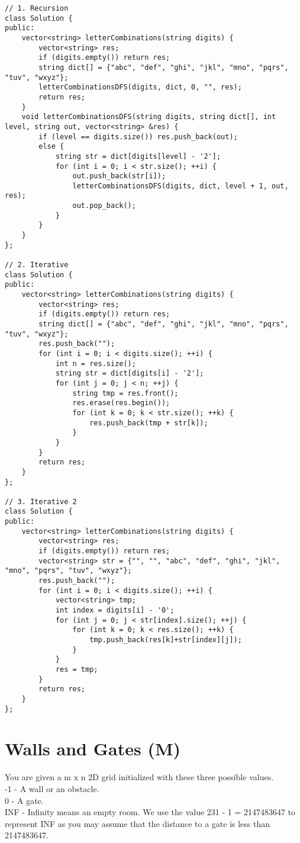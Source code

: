 \begin{lstlisting}
// 1. Recursion
class Solution {
public:
    vector<string> letterCombinations(string digits) {
        vector<string> res;
        if (digits.empty()) return res;
        string dict[] = {"abc", "def", "ghi", "jkl", "mno", "pqrs", "tuv", "wxyz"};
        letterCombinationsDFS(digits, dict, 0, "", res);
        return res;
    }
    void letterCombinationsDFS(string digits, string dict[], int level, string out, vector<string> &res) {
        if (level == digits.size()) res.push_back(out);
        else {
            string str = dict[digits[level] - '2'];
            for (int i = 0; i < str.size(); ++i) {
                out.push_back(str[i]);
                letterCombinationsDFS(digits, dict, level + 1, out, res);
                out.pop_back();
            }
        }
    }
};

// 2. Iterative
class Solution {
public:
    vector<string> letterCombinations(string digits) {
        vector<string> res;
        if (digits.empty()) return res;
        string dict[] = {"abc", "def", "ghi", "jkl", "mno", "pqrs", "tuv", "wxyz"};
        res.push_back("");
        for (int i = 0; i < digits.size(); ++i) {
            int n = res.size();
            string str = dict[digits[i] - '2'];
            for (int j = 0; j < n; ++j) {
                string tmp = res.front();
                res.erase(res.begin());
                for (int k = 0; k < str.size(); ++k) {
                    res.push_back(tmp + str[k]);
                }
            }
        }
        return res;
    }
};

// 3. Iterative 2
class Solution {
public:
    vector<string> letterCombinations(string digits) {
        vector<string> res;
        if (digits.empty()) return res;
        vector<string> str = {"", "", "abc", "def", "ghi", "jkl", "mno", "pqrs", "tuv", "wxyz"};
        res.push_back("");
        for (int i = 0; i < digits.size(); ++i) {
            vector<string> tmp;
            int index = digits[i] - '0';
            for (int j = 0; j < str[index].size(); ++j) {
                for (int k = 0; k < res.size(); ++k) {
                    tmp.push_back(res[k]+str[index][j]);
                }
            }
            res = tmp;
        }
        return res;
    }
};
\end{lstlisting}


\section{Walls and Gates (M)}
You are given a m x n 2D grid initialized with these three possible values.\\
    -1 - A wall or an obstacle.\\
    0 - A gate.\\
    INF - Infinity means an empty room. We use the value 231 - 1 = 2147483647 to represent INF as you may assume that the distance to a gate is less than 2147483647.\\

